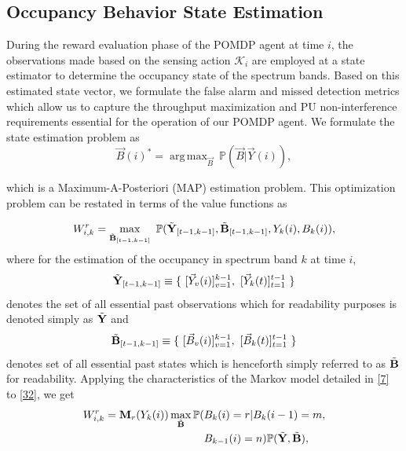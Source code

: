 \documentclass[10pt,twocolumn]{IEEEtran}
\newcommand{\nm}[1]{}
\DeclareMathOperator*{\argmax}{arg\,max}
\begin{document}
\subsection{Occupancy Behavior State Estimation}
During the reward evaluation phase of the POMDP agent at time $i$, the observations made based on the sensing action $\mathcal{K}_i$ are employed at a state estimator to determine the occupancy state of the spectrum bands. Based on this estimated state vector, we formulate the false alarm and missed detection metrics which allow us to capture the throughput maximization and PU non-interference requirements essential for the operation of our POMDP agent. We formulate the state estimation problem as\nm{which value function? You have already defined the value function V for the POMDP, dont confuse the two things}
\begin{equation}\label{31}
    \vec{B}(i)^* = \argmax_{\vec{B}}\ \mathbb{P}(\vec{B}|\vec{Y}(i)),
\end{equation}
\nm{isnt this conditional on the belief as well?}
which is a Maximum-A-Posteriori (MAP) estimation problem. This optimization problem can be restated in terms of the value functions as
\nm{I dont understand why you need to go through all of this.. if you have the posterior belief $\hat \beta$, that is all you need to do your MAP estimate, i.e. $ \vec{B}(i)^* = \argmax_{\vec{B}}\hat\beta_i(\vec{B})$}
\begin{equation}\label{32}
    W_{i,k}^{r} = \max_{\Tilde{\mathbf{B}}_{[t-1,k-1]}}\ \mathbb{P}(\Tilde{\mathbf{Y}}_{[t-1,k-1]},\Tilde{\mathbf{B}}_{[t-1,k-1]},Y_k(i),B_k(i)),
\end{equation}
where for the estimation of the occupancy in spectrum band $k$ at time $i$, 
\begin{equation}\label{33}
    \Tilde{\mathbf{Y}}_{[t-1,k-1]} \equiv \{\ [\vec{Y}_v(i)]_{v=1}^{k-1},\ [\vec{Y}_k(t)]_{t=1}^{t-1}\ \}
\end{equation}
denotes the set of all essential past observations which for readability purposes is denoted simply as $\Tilde{\mathbf{Y}}$ and
\begin{equation}\label{34}
    \Tilde{\mathbf{B}}_{[t-1,k-1]} \equiv \{\ [\vec{B}_v(i)]_{v=1}^{k-1},\ [\vec{B}_k(t)]_{t=1}^{t-1}\ \}
\end{equation}
denotes set of all essential past states which is henceforth simply referred to as $\Tilde{\textbf{B}}$ for readability. Applying the characteristics of the Markov model detailed in \eqref{7} to \eqref{32}, we get
\begin{equation}\label{35}
    \begin{aligned}
        W_{i,k}^{r} = \mathbf{M}_r(Y_k(i))\max_{\Tilde{\mathbf{B}}}\mathbb{P}(&B_k(i)=r|B_{k}(i-1)=m,\\
        &B_{k-1}(i)=n)\mathbb{P}(\Tilde{\mathbf{Y}},\Tilde{\mathbf{B}}),
    \end{aligned}
\end{equation}
\end{document}
